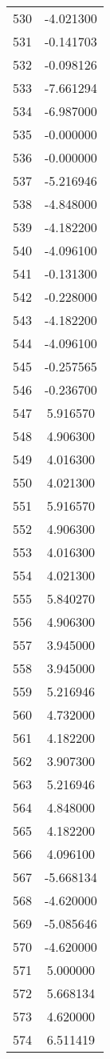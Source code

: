 \documentclass[12pt]{article}
\begin{document}
\begin{longtable}{@{}cc@{}}
530 & -4.021300 \\
531 & -0.141703 \\
532 & -0.098126 \\
533 & -7.661294 \\
534 & -6.987000 \\
535 & -0.000000 \\
536 & -0.000000 \\
537 & -5.216946 \\
538 & -4.848000 \\
539 & -4.182200 \\
540 & -4.096100 \\
541 & -0.131300 \\
542 & -0.228000 \\
543 & -4.182200 \\
544 & -4.096100 \\
545 & -0.257565 \\
546 & -0.236700 \\
547 & 5.916570 \\
548 & 4.906300 \\
549 & 4.016300 \\
550 & 4.021300 \\
551 & 5.916570 \\
552 & 4.906300 \\
553 & 4.016300 \\
554 & 4.021300 \\
555 & 5.840270 \\
556 & 4.906300 \\
557 & 3.945000 \\
558 & 3.945000 \\
559 & 5.216946 \\
560 & 4.732000 \\
561 & 4.182200 \\
562 & 3.907300 \\
563 & 5.216946 \\
564 & 4.848000 \\
565 & 4.182200 \\
566 & 4.096100 \\
567 & -5.668134 \\
568 & -4.620000 \\
569 & -5.085646 \\
570 & -4.620000 \\
571 & 5.000000 \\
572 & 5.668134 \\
573 & 4.620000 \\
574 & 6.511419 \\

\end{longtable}
\end{document}

